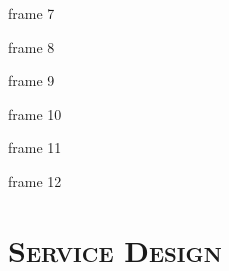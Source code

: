 \documentclass[xcolor=x11names,compress]{beamer}
\renewcommand{\(}{\begin{columns}}
\renewcommand{\)}{\end{columns}}
\newcommand{\<}[1]{\begin{column}{#1}}
\renewcommand{\>}{\end{column}}
\begin{document}
\begin{frame}{frame 7}

\end{frame}
\begin{frame}{frame 8}

\end{frame}
\begin{frame}{frame 9}

\end{frame}
\begin{frame}{frame 10}

\end{frame}
\begin{frame}{frame 11}

\end{frame}
\begin{frame}{frame 12}

\end{frame}
\section{\scshape Service Design}
\end{document}
